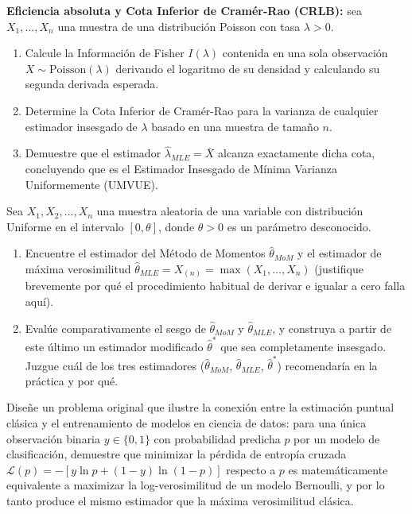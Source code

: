 \begin{problema}
	\label{prob:977b8dd}
	\textbf{Eficiencia absoluta y Cota Inferior de Cramér-Rao (CRLB):} sea $X_1,\dots,X_n$ una muestra de una distribución Poisson con tasa $\lambda>0$.
	\begin{enumerate}
		\item Calcule la Información de Fisher $I(\lambda)$ contenida en una sola observación $X \sim \text{Poisson}(\lambda)$ derivando el logaritmo de su densidad y calculando su segunda derivada esperada.
		\item Determine la Cota Inferior de Cramér-Rao para la varianza de cualquier estimador insesgado de $\lambda$ basado en una muestra de tamaño $n$.
		\item Demuestre que el estimador $\hat{\lambda}_{MLE} = \bar{X}$ alcanza exactamente dicha cota, concluyendo que es el Estimador Insesgado de Mínima Varianza Uniformemente (UMVUE).
	\end{enumerate}
\end{problema}

\begin{problema}
	\label{prob:23bb182}
	Sea $X_1, X_2, \ldots, X_n$ una muestra aleatoria de una variable con distribución Uniforme en el intervalo $[0, \theta]$, donde $\theta > 0$ es un parámetro desconocido.
	\begin{enumerate}
		\item Encuentre el estimador del Método de Momentos $\hat{\theta}_{MoM}$ y el estimador de máxima verosimilitud $\hat{\theta}_{MLE} = X_{(n)} = \max(X_1,\dots,X_n)$ (justifique brevemente por qué el procedimiento habitual de derivar e igualar a cero falla aquí).
		\item Evalúe comparativamente el sesgo de $\hat{\theta}_{MoM}$ y $\hat{\theta}_{MLE}$, y construya a partir de este último un estimador modificado $\hat{\theta}^*$ que sea completamente insesgado. Juzgue cuál de los tres estimadores ($\hat{\theta}_{MoM}$, $\hat{\theta}_{MLE}$, $\hat{\theta}^*$) recomendaría en la práctica y por qué.
	\end{enumerate}
\end{problema}

\begin{problema}
	\label{prob:0675127}
	Diseñe un problema original que ilustre la conexión entre la estimación puntual clásica y el entrenamiento de modelos en ciencia de datos: para una única observación binaria $y \in \{0,1\}$ con probabilidad predicha $p$ por un modelo de clasificación, demuestre que minimizar la pérdida de entropía cruzada $\mathcal{L}(p) = -[y\ln p + (1-y)\ln(1-p)]$ respecto a $p$ es matemáticamente equivalente a maximizar la log-verosimilitud de un modelo Bernoulli, y por lo tanto produce el mismo estimador que la máxima verosimilitud clásica.
\end{problema}

